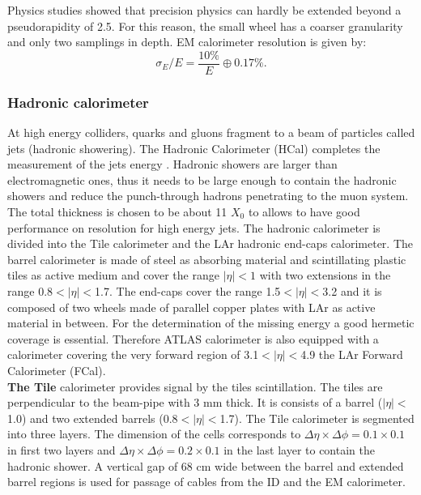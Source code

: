 Physics studies showed that precision physics can hardly be extended beyond a pseudorapidity of 2.5. For this reason, the small wheel has a coarser granularity and only two samplings in depth. EM calorimeter resolution is given by:
\begin{equation}
    \sigma_E/E = \frac{10\%}{E} \oplus 0.17\%.
\end{equation}
\subsubsection{Hadronic calorimeter}
\label{chap2:ATLAS:Calo:HCAL}
 At high energy colliders, quarks and gluons fragment to a beam of particles called jets (hadronic showering). The Hadronic Calorimeter (HCal) completes the measurement of the jets energy \cite{Tile_TDR}. Hadronic showers are larger than electromagnetic ones, thus it needs to be large enough to contain the hadronic showers and reduce the punch-through hadrons penetrating to the muon system. The total thickness is chosen to be about 11 $X_0$ to allows to have good performance on resolution for high energy jets. The hadronic calorimeter is divided into the Tile calorimeter and the LAr hadronic end-caps calorimeter. The barrel calorimeter is made of steel as absorbing material and scintillating plastic tiles as active medium and cover the range $|\eta|<1$ with two extensions in the range 0.8$<|\eta|<$1.7. The end-caps cover the range 1.5$<|\eta|<$3.2 and it is composed of two wheels made of parallel copper plates with LAr as active material in between. For the determination of the missing energy a good hermetic coverage is essential. Therefore ATLAS calorimeter is also equipped with a calorimeter covering the very forward region of 3.1$<|\eta|<$4.9 the LAr Forward Calorimeter (FCal). \\
 \textbf{The Tile} calorimeter provides signal by the tiles scintillation. The tiles are perpendicular to the beam-pipe with 3 mm thick. It is consists of a barrel ($|\eta|<$1.0) and two extended barrels (0.8$<|\eta|<$1.7). The Tile calorimeter is segmented into three layers. The dimension of the cells corresponds to $\Delta\eta\times\Delta\phi= 0.1\times0.1$ in first two layers and $\Delta\eta\times\Delta\phi= 0.2\times0.1$ in the last layer to contain the hadronic shower. A vertical gap of 68 cm wide between the barrel and extended barrel regions is used for passage of cables from the ID and the EM calorimeter. \\

